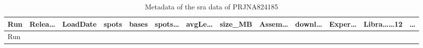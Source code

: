 \documentclass[
]{article}
\begin{document}
\begin{longtable}[]{@{}lllllllllllll@{}}
\caption{\label{tab:metadata-of-the-sra-data-of-PRJNA824185}Metadata of the sra data of PRJNA824185}\tabularnewline
\toprule
\begin{minipage}[b]{0.05\columnwidth}\raggedright
Run\strut
\end{minipage} & \begin{minipage}[b]{0.05\columnwidth}\raggedright
Relea\ldots{}\strut
\end{minipage} & \begin{minipage}[b]{0.05\columnwidth}\raggedright
LoadDate\strut
\end{minipage} & \begin{minipage}[b]{0.04\columnwidth}\raggedright
spots\strut
\end{minipage} & \begin{minipage}[b]{0.05\columnwidth}\raggedright
bases\strut
\end{minipage} & \begin{minipage}[b]{0.05\columnwidth}\raggedright
spots\ldots{}\strut
\end{minipage} & \begin{minipage}[b]{0.05\columnwidth}\raggedright
avgLe\ldots{}\strut
\end{minipage} & \begin{minipage}[b]{0.05\columnwidth}\raggedright
size\_MB\strut
\end{minipage} & \begin{minipage}[b]{0.05\columnwidth}\raggedright
Assem\ldots{}\strut
\end{minipage} & \begin{minipage}[b]{0.05\columnwidth}\raggedright
downl\ldots{}\strut
\end{minipage} & \begin{minipage}[b]{0.05\columnwidth}\raggedright
Exper\ldots{}\strut
\end{minipage} & \begin{minipage}[b]{0.08\columnwidth}\raggedright
Libra\ldots\ldots12\strut
\end{minipage} & \begin{minipage}[b]{0.02\columnwidth}\raggedright
\ldots{}\strut
\end{minipage}\tabularnewline
\midrule
\endfirsthead
\toprule
\begin{minipage}[b]{0.05\columnwidth}\raggedright
Run\strut
\end{minipage} & \begin{minipage}[b]{0.05\columnwidth}\raggedright

\end{minipage}
\end{longtable}
\end{document}
